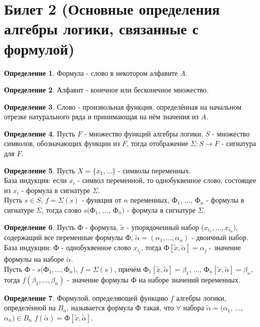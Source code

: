 \documentclass[a4paper, 12pt]{article}
\theoremstyle{definition}
\newtheorem*{definition}{Определение}
\theoremstyle{plain}
\theoremstyle{remark}
\begin{document}
  \section{Билет 2 (Основные определения алгебры логики, связанные с формулой)}
  \begin{definition}
    Формула - слово в некотором алфавите $A$.
  \end{definition}
  \begin{definition}
    Алфавит - конечное или бесконечное множество.
  \end{definition}
  \begin{definition}
    Слово - произвольная функция, определённая на начальном отрезке натурального ряда и принимающая на нём значения из $A$.
  \end{definition}
  \begin{definition}
    Пусть $F$ - множество функций алгебры логики, $S$ - множество символов, обозначающих функции из $F$, тогда отображение $\Sigma : S \to F$ - сигнатура для $F$.
  \end{definition}
  \begin{definition}
    Пусть $X=\{x_1, \ldots\}$ - символы переменных.\\
    База индукция: если $x_i$ - символ переменной, то однобуквенное слово, состоящее из $x_i$ - формула в сигнатуре $\Sigma$.\\
    Пусть $s\in S$, $f=\Sigma(s)$ - функция от $n$ переменных, Ф$_1$, $\ldots$, Ф$_n$ - формулы в сигнатуре $\Sigma$, тогда слово $s($Ф$_1$, $\ldots$, Ф$_n)$ - формула в сигнатуре $\Sigma$.  
  \end{definition}
  \begin{definition}
    Пусть Ф - формула, $\tilde{x}$ - упорядоченный набор ($x_{i_1}, \ldots, x_{i_n})$, содержащий все переменные формулы Ф, $\tilde{\alpha}=(\alpha_1, \ldots, \alpha_n)$ - двоичный набор.\\
    База индукции: Ф - однобуквенное слово $x_{i_j}$, тогда Ф$[\tilde{x}, \tilde{\alpha}]=\alpha_j$ - значение формулы на наборе $\tilde{\alpha}$.\\
    Пусть Ф - $s($Ф$_1, \ldots, $Ф$_n)$, $f=\Sigma(s)$, причём Ф$_1[\tilde{x}, \tilde{\alpha}]=\beta_1$, $\ldots$, Ф$_n[\tilde{x}, \tilde{\alpha}]=\beta_n$, тогда $f(\beta_1, \ldots, \beta_n)$ - значение формулы Ф на наборе значений переменных.
  \end{definition}
  \begin{definition}
    Формулой, определяющей функцию $f$ алгебры логики, определённой на $B_n$, называется формула Ф такая, что $\forall$ набора $\tilde{\alpha}=(\alpha_1$, $\ldots$, $\alpha_n)\in B_n$ $f(\tilde{\alpha})=$Ф$[\tilde{x}, \tilde{\alpha}]$.
  \end{definition}
\end{document}
